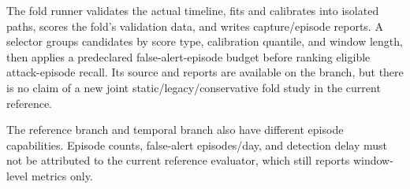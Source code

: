 The fold runner validates the actual timeline, fits and calibrates into
isolated paths, scores the fold's validation data, and writes capture/episode
reports. A selector groups candidates by score type, calibration quantile,
and window length, then applies a predeclared false-alert-episode budget before
ranking eligible attack-episode recall. Its source and reports are available
on the branch, but there is no claim of a new joint static/legacy/conservative
fold study in the current reference.

The reference branch and temporal branch also have different episode
capabilities. Episode counts, false-alert episodes/day, and detection delay
must not be attributed to the current reference evaluator, which still reports
window-level metrics only.

